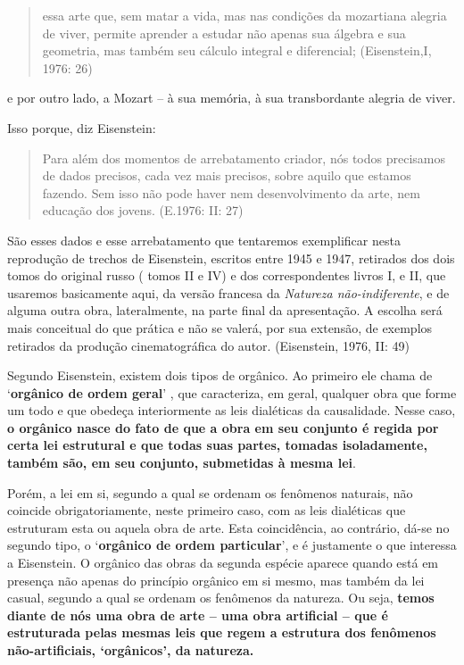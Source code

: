 \begin{quote}
essa arte que, sem matar a vida, mas nas condições da mozartiana alegria
de viver, permite aprender a estudar não apenas sua álgebra e sua
geometria, mas também seu cálculo integral e diferencial; (Eisenstein,I,
1976: 26)
\end{quote}

e por outro lado, a Mozart -- à sua memória, à sua transbordante alegria
de viver.

Isso porque, diz Eisenstein:

\begin{quote}
Para além dos momentos de arrebatamento criador, nós todos precisamos de
dados precisos, cada vez mais precisos, sobre aquilo que estamos
fazendo. Sem isso não pode haver nem desenvolvimento da arte, nem
educação dos jovens. (E.1976: II: 27)
\end{quote}

São esses dados e esse arrebatamento que tentaremos exemplificar nesta
reprodução de trechos de Eisenstein, escritos entre 1945 e 1947,
retirados dos dois tomos do original russo ( tomos II e IV) e dos
correspondentes livros I, e II, que usaremos basicamente aqui, da versão
francesa da \emph{Natureza não-indiferente}, e de alguma outra obra,
lateralmente, na parte final da apresentação. A escolha será mais
conceitual do que prática e não se valerá, por sua extensão, de exemplos
retirados da produção cinematográfica do autor. (Eisenstein, 1976, II:
49)

Segundo Eisenstein, existem dois tipos de orgânico. Ao primeiro ele
chama de `\textbf{orgânico de ordem geral}' , que caracteriza, em geral,
qualquer obra que forme um todo e que obedeça interiormente as leis
dialéticas da causalidade. Nesse caso, \textbf{o orgânico nasce do fato
de que a obra em seu conjunto é regida por certa lei estrutural e que
todas suas partes, tomadas isoladamente, também são, em seu conjunto,
submetidas à mesma lei}.

Porém, a lei em si, segundo a qual se ordenam os fenômenos naturais, não
coincide obrigatoriamente, neste primeiro caso, com as leis dialéticas
que estruturam esta ou aquela obra de arte. Esta coincidência, ao
contrário, dá-se no segundo tipo, o `\textbf{orgânico de ordem
particular}', e é justamente o que interessa a Eisenstein. O orgânico
das obras da segunda espécie aparece quando está em presença não apenas
do princípio orgânico em si mesmo, mas também da lei casual, segundo a
qual se ordenam os fenômenos da natureza. Ou seja, \textbf{temos diante
de nós uma obra de arte -- uma obra artificial -- que é estruturada
pelas mesmas leis que regem a estrutura dos fenômenos não-artificiais,
`orgânicos', da natureza.}

